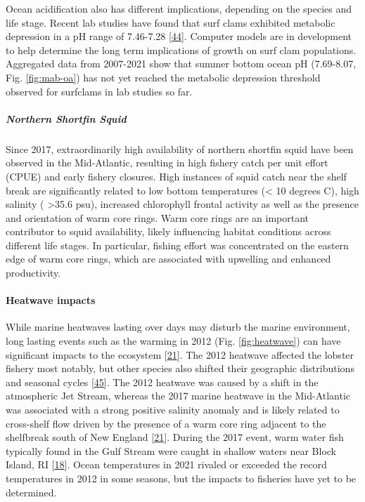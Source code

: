 \documentclass[
  10pt,
]{article}
\begin{document}
Ocean acidification also has different implications, depending on the
species and life stage. Recent lab studies have found that surf clams
exhibited metabolic depression in a pH range of 7.46-7.28
{[}\protect\hyperlink{ref-pousse_energetic_2020}{44}{]}. Computer models
are in development to help determine the long term implications of
growth on surf clam populations. Aggregated data from 2007-2021 show
that summer bottom ocean pH (7.69-8.07, Fig. \ref{fig:mab-oa}) has not
yet reached the metabolic depression threshold observed for surfclams in
lab studies so far.

\hypertarget{northern-shortfin-squid}{%
\subparagraph{\texorpdfstring{\emph{Northern Shortfin
Squid}}{Northern Shortfin Squid}}\label{northern-shortfin-squid}}

Since 2017, extraordinarily high availability of northern shortfin squid
have been observed in the Mid-Atlantic, resulting in high fishery catch
per unit effort (CPUE) and early fishery closures. High instances of
squid catch near the shelf break are significantly related to low bottom
temperatures (\textless{} 10 degrees C), high salinity (
\textgreater35.6 psu), increased chlorophyll frontal activity as well as
the presence and orientation of warm core rings. Warm core rings are an
important contributor to squid availability, likely influencing habitat
conditions across different life stages. In particular, fishing effort
was concentrated on the eastern edge of warm core rings, which are
associated with upwelling and enhanced productivity.

\hypertarget{heatwave-impacts}{%
\paragraph{Heatwave impacts}\label{heatwave-impacts}}

While marine heatwaves lasting over days may disturb the marine
environment, long lasting events such as the warming in 2012 (Fig.
\ref{fig:heatwave}) can have significant impacts to the ecosystem
{[}\protect\hyperlink{ref-gawarkiewicz_characteristics_2019}{21}{]}. The
2012 heatwave affected the lobster fishery most notably, but other
species also shifted their geographic distributions and seasonal cycles
{[}\protect\hyperlink{ref-mills_fisheries_2013}{45}{]}. The 2012
heatwave was caused by a shift in the atmospheric Jet Stream, whereas
the 2017 marine heatwave in the Mid-Atlantic was associated with a
strong positive salinity anomaly and is likely related to cross-shelf
flow driven by the presence of a warm core ring adjacent to the
shelfbreak south of New England
{[}\protect\hyperlink{ref-gawarkiewicz_characteristics_2019}{21}{]}.
During the 2017 event, warm water fish typically found in the Gulf
Stream were caught in shallow waters near Block Island, RI
{[}\protect\hyperlink{ref-gawarkiewicz_changing_2018}{18}{]}. Ocean
temperatures in 2021 rivaled or exceeded the record temperatures in 2012
in some seasons, but the impacts to fisheries have yet to be determined.
\end{document}
